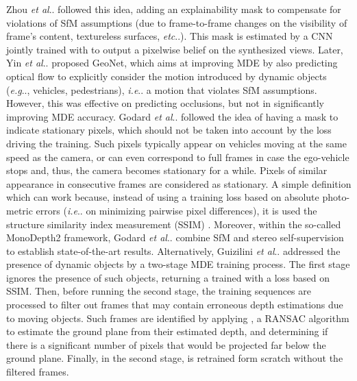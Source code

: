\documentclass[journal]{IEEEtran}
\makeatletter
\DeclareRobustCommand\onedot{\futurelet\@let@token\@onedot}
\def\@onedot{\ifx\@let@token.\else.\null\fi\xspace}
\def\eg{\emph{e.g}\onedot} \def\Eg{\emph{E.g}\onedot}
\def\ie{\emph{i.e}\onedot} \def\Ie{\emph{I.e}\onedot}
\def\etc{\emph{etc}\onedot} \def\vs{\emph{vs}\onedot}
\def\etal{\emph{et al}\onedot}
\makeatother
\begin{document}
Zhou {\etal} \cite{Zhou:2017} followed this idea, adding an explainability mask to compensate for violations of SfM assumptions (due to frame-to-frame changes on the visibility of frame's content, textureless surfaces, {\etc}). This mask is estimated by a CNN jointly trained with  to output a pixelwise belief on the synthesized views. Later, Yin {\etal} \cite{Yin:2018GeoNet} proposed GeoNet, which aims at improving MDE by also predicting optical flow to explicitly consider the motion introduced by dynamic objects ({\eg}, vehicles, pedestrians), {\ie} a motion that violates SfM assumptions. However, this was effective on predicting occlusions, but not in significantly improving MDE accuracy. Godard {\etal} \cite{Godard:2019MonoDepth2} followed the idea of having a mask to indicate stationary pixels, which should not be taken into account by the loss driving the training. Such pixels typically appear on vehicles moving at the same speed as the camera, or can even correspond to full frames in case the ego-vehicle stops and, thus, the camera becomes stationary for a while. Pixels of similar appearance in consecutive frames are considered as stationary. A simple definition which can work because, instead of using a training loss based on absolute photo-metric errors ({\ie} on minimizing pairwise pixel differences), it is used the structure similarity index measurement (SSIM) \cite{Wang:2004}. Moreover, within the so-called  MonoDepth2 framework, Godard {\etal} \cite{Godard:2019MonoDepth2} combine SfM and stereo self-supervision to establish state-of-the-art results. Alternatively, Guizilini {\etal} \cite{Guizilini:2020semantic} addressed the presence of dynamic objects by a two-stage MDE training process. The first stage ignores the presence of such objects, returning a  trained with a loss based on SSIM. Then, before running the second stage, the training sequences are processed to filter out frames that may contain erroneous depth estimations due to moving objects. Such frames are identified by applying , a RANSAC algorithm to estimate the ground plane from their estimated depth, and determining if there is a significant number of pixels that would be projected far below the ground plane. Finally, in the second stage,  is retrained form scratch without the filtered frames. 
\end{document}
